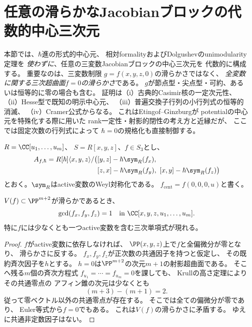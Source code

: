 \section{任意の滑らかなJacobianブロックの代数的中心三次元}
\label{sec:pg-universal-determinant}
本節では、$\hbar$進の形式的中心元、
相対formalityおよびDolgushevのunimodularity定理を
\emph{使わずに}、任意の三変数Jacobianブロックの中心三次元を
代数的に構成する。
重要なのは、三変数制限
$g=f(x,y,z,0)$の滑らかさではなく、
\emph{全変数に関する三次超曲面$f=0$の滑らかさ}である。
$g$が節点型・尖点型・可約、あるいは恒等的に零の場合も含む。
証明は（i）古典的Casimir核の一定次元性、
（ii）Hesse型で既知の明示中心元、
（iii）普遍交換子行列の小行列式の恒等的消滅、
（iv）Cramer公式からなる。
これはEtingof--Ginzburg\cite[\S8.3]{EG}が
potentialの中心元を特殊化する際に用いた
rank一定性・射影的閉性の考え方と近縁だが、
ここでは固定次数の行列式によって
$\hbar=0$の規格化も直接制御する。

$R=\CC[u_1,\ldots,u_m]$、
$S=R[x,y,z]$、$f\in S_3$とし、
\begin{equation}
 \begin{aligned}
 A_{f,\hbar}
 =R[\hbar]\langle x,y,z\rangle/
 \bigl(&[y,z]-\hbar\sym_R(f_x),\\
       &[z,x]-\hbar\sym_R(f_y),\
       [x,y]-\hbar\sym_R(f_z)\bigr)
 \end{aligned}
 \label{eq:pg-det-quantum}
\end{equation}
とおく。$\sym_R$はactive変数のWeyl対称化である。
$f_{\mathrm{cent}}=f(0,0,0,u)$と書く。

\begin{lemma}[滑らかさとactive偏微分の最大公約因子]
\label{lem:pg-det-gradient-coprime}
$V(f)\subset\PP^{m+2}$が滑らかであるとき、
\begin{equation}
 \gcd(f_x,f_y,f_z)=1
 \quad\text{in }\CC[x,y,z,u_1,\ldots,u_m].
 \label{eq:pg-det-gradient-coprime}
\end{equation}
特に$f$には少なくとも一つactive変数を含む三次単項式が現れる。
\end{lemma}
\begin{proof}
$f$がactive変数に依存しなければ、
$\PP(x,y,z)$上で$f$と全偏微分が零となり、
滑らかさに反する。
$f_x,f_y,f_z$が正次数の共通因子を持つと仮定し、
その既約斉次因子を$h$とする。
$h=0$は$\PP^{m+2}$の次元$m+1$の射影超曲面である。
そこへ残る$m$個の斉次方程式
$f_{u_1}=\cdots=f_{u_m}=0$を課しても、
Krullの高さ定理によりその共通零点の
アフィン錐の次元は少なくとも
\begin{equation}
 (m+3)-(m+1)=2.
 \label{eq:pg-det-gradient-dimension}
\end{equation}
従って零ベクトル以外の共通零点が存在する。
そこでは全ての偏微分が零であり、
Euler等式から$f=0$でもある。
これは$V(f)$の滑らかさに矛盾する。
ゆえに共通非定数因子はない。
\end{proof}

